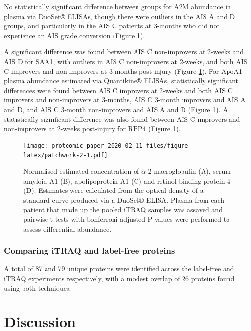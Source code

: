 \documentclass[9pt,lineno]{elife}
\begin{document}
\begin{landscape}
\begin{landscape}
No statistically significant difference between groups for A2M abundance in plasma via DuoSet® ELISAs, though there were outliers in the AIS A and D groups, and particularly in the AIS C patients at 3-months who did not experience an AIS grade conversion (Figure \ref{fig:patchwork-2}).

A significant difference was found between AIS C non-improvers at 2-weeks and AIS D for SAA1, with outliers in AIS C non-improvers at 2-weeks, and both AIS C improvers and non-improvers at 3-months post-injury (Figure \ref{fig:patchwork-2}).
For ApoA1 plasma abundance estimated via Quantikine® ELISAs, statistically significant differences were found between AIS C improvers at 2-weeks and both AIS C improvers and non-improvers at 3-months, AIS C 3-month improvers and AIS A and D, and AIS C 3-month non-improvers and AIS A and D (Figure \ref{fig:patchwork-2}).
A statistically significant difference was also found between AIS C improvers and non-improvers at 2-weeks post-injury for RBP4 (Figure \ref{fig:patchwork-2}).



\begin{figure}
\centering
\texttt{[image: proteomic\_paper\_2020-02-11\_files/figure-latex/patchwork-2-1.pdf]}
\caption{\label{fig:patchwork-2}Normalised estimated concentration of \(\alpha\)-2-macroglobulin (A), serum amyloid A1 (B), apolipoprotein A1 (C) and retinol binding protein 4 (D). Estimates were calculated from the optical density of a standard curve produced via a DuoSet® ELISA. Plasma from each patient that made up the pooled iTRAQ samples was assayed and pairwise t-tests with bonferroni adjusted P-values were performed to assess differential abundance.}
\end{figure}

\hypertarget{comparing-itraq-and-label-free-proteins}{%
\subsubsection{Comparing iTRAQ and label-free proteins}\label{comparing-itraq-and-label-free-proteins}}

A total of 87 and 79 unique proteins were identified across the label-free and iTRAQ experiments respectively, with a modest overlap of 26 proteins found using both techniques.



\hypertarget{discussion}{%
\section{Discussion}\label{discussion}}


\end{landscape}
\end{landscape}
\end{document}
